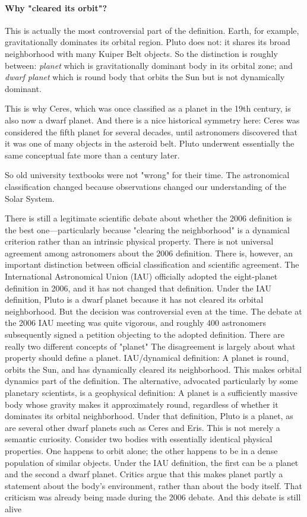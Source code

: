 \paragraph{Why "cleared its orbit"?}
This is actually the most controversial part of the definition.
Earth, for example, gravitationally dominates its orbital region. Pluto does not: it shares its broad neighborhood with many Kuiper Belt objects. So the distinction is roughly between:
\emph{planet} which is gravitationally dominant body in its orbital zone; and
\emph{dwarf planet} which is round body that orbits the Sun but is not dynamically dominant.

This is why Ceres, which was once classified as a planet in the 19th century, is also now a dwarf planet.
And there is a nice historical symmetry here: Ceres was considered the fifth planet for several decades, until astronomers discovered that it was one of many objects in the asteroid belt. Pluto underwent essentially the same conceptual fate more than a century later.

So old university textbooks were not "wrong" for their time. The astronomical classification changed because observations changed our understanding of the Solar System.

There is still a legitimate scientific debate about whether the 2006 definition is the best one—particularly because "clearing the neighborhood" is a dynamical criterion rather than an intrinsic physical property.
There is not universal agreement among astronomers about the 2006 definition. There is, however, an important distinction between official classification and scientific agreement.
The International Astronomical Union (IAU) officially adopted the eight-planet definition in 2006, and it has not changed that definition. Under the IAU definition, Pluto is a dwarf planet because it has not cleared its orbital neighborhood.
But the decision was controversial even at the time. The debate at the 2006 IAU meeting was quite vigorous, and roughly 400 astronomers subsequently signed a petition objecting to the adopted definition.
There are really two different concepts of "planet"
The disagreement is largely about what property should define a planet.
IAU/dynamical definition:
A planet is round, orbits the Sun, and has dynamically cleared its neighborhood.
This makes orbital dynamics part of the definition.
The alternative, advocated particularly by some planetary scientists, is a geophysical definition:
A planet is a sufficiently massive body whose gravity makes it approximately round, regardless of whether it dominates its orbital neighborhood.
Under that definition, Pluto is a planet, as are several other dwarf planets such as Ceres and Eris.
This is not merely a semantic curiosity. Consider two bodies with essentially identical physical properties. One happens to orbit alone; the other happens to be in a dense population of similar objects. Under the IAU definition, the first can be a planet and the second a dwarf planet. Critics argue that this makes planet partly a statement about the body's environment, rather than about the body itself. That criticism was already being made during the 2006 debate.
And this debate is still alive

